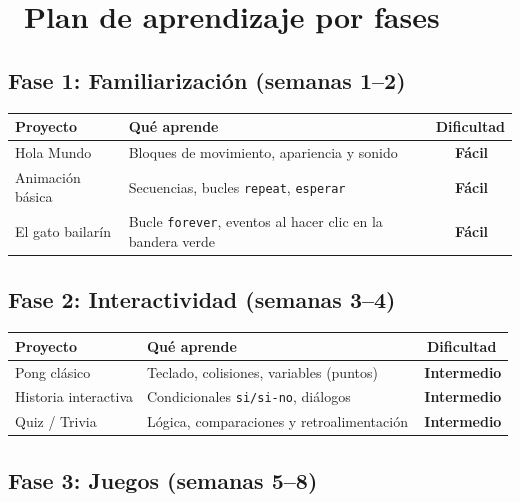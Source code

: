 \documentclass[11pt,a4paper]{article}
\newcommand{\iconotexto}[2]{\textcolor{cyanNeon}{\faIcon{#1}}~#2}
\newcommand{\facil}{\textcolor{verdeSignal}{\faIcon{circle}\,\textbf{Fácil}}}
\newcommand{\intermedio}{\textcolor{naranjaVivo}{\faIcon{circle}\,\textbf{Intermedio}}}
\begin{document}
\section{\iconotexto{gamepad}{Plan de aprendizaje por fases}}

\subsection{Fase 1: Familiarización (semanas 1--2)}

\begin{center}
\renewcommand{\arraystretch}{1.3}
\begin{tabularx}{\linewidth}{l X c}
\toprule
\textbf{Proyecto} & \textbf{Qué aprende} & \textbf{Dificultad} \\
\midrule
Hola Mundo            & Bloques de movimiento, apariencia y sonido       & \facil \\
Animación básica      & Secuencias, bucles \texttt{repeat}, \texttt{esperar} & \facil \\
El gato bailarín      & Bucle \texttt{forever}, eventos al hacer clic en la bandera verde & \facil \\
\bottomrule
\end{tabularx}
\end{center}

\subsection{Fase 2: Interactividad (semanas 3--4)}

\begin{center}
\renewcommand{\arraystretch}{1.3}
\begin{tabularx}{\linewidth}{l X c}
\toprule
\textbf{Proyecto} & \textbf{Qué aprende} & \textbf{Dificultad} \\
\midrule
Pong clásico          & Teclado, colisiones, variables (puntos)          & \intermedio \\
Historia interactiva  & Condicionales \texttt{si/si-no}, diálogos         & \intermedio \\
Quiz / Trivia         & Lógica, comparaciones y retroalimentación         & \intermedio \\
\bottomrule
\end{tabularx}
\end{center}

\subsection{Fase 3: Juegos (semanas 5--8)}
\end{document}
